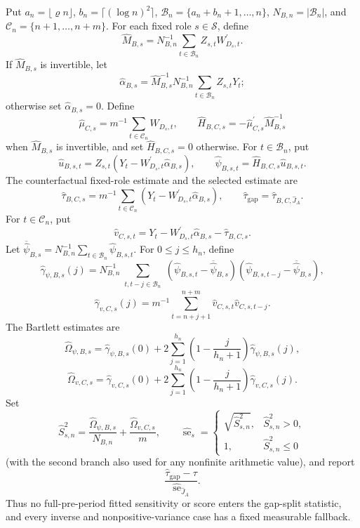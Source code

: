 Put \(a_n=\lfloor\varrho n\rfloor\), \(b_n=\lceil(\log n)^2\rceil\), \(\mathcal B_n=\{a_n+b_n+1,\ldots,n\}\), \(N_{B,n}=|\mathcal B_n|\), and \(\mathcal C_n=\{n+1,\ldots,n+m\}\).  For each fixed role \(s\in\mathcal S\), define
\[
 \widehat M_{B,s}=N_{B,n}^{-1}\sum_{t\in\mathcal B_n}Z_{s,t}W_{D_s,t}^{\prime}.
\]
If \(\widehat M_{B,s}\) is invertible, let
\[
 \widehat\alpha_{B,s}
 =\widehat M_{B,s}^{-1}N_{B,n}^{-1}
   \sum_{t\in\mathcal B_n}Z_{s,t}Y_t;
\]
otherwise set \(\widehat\alpha_{B,s}=0\).  Define
\[
 \widehat\mu_{C,s}=m^{-1}\sum_{t\in\mathcal C_n}W_{D_s,t},
 \qquad
 \widehat H_{B,C,s}=-\widehat\mu_{C,s}^{\prime}\widehat M_{B,s}^{-1}
\]
when \(\widehat M_{B,s}\) is invertible, and set \(\widehat H_{B,C,s}=0\) otherwise.  For \(t\in\mathcal B_n\), put
\[
 \widehat u_{B,s,t}=Z_{s,t}
  (Y_t-W_{D_s,t}^{\prime}\widehat\alpha_{B,s}),
 \qquad
 \widehat\psi_{B,s,t}=\widehat H_{B,C,s}\widehat u_{B,s,t}.
\]
The counterfactual fixed-role estimate and the selected estimate are
\[
 \widehat\tau_{B,C,s}=m^{-1}\sum_{t\in\mathcal C_n}
 (Y_t-W_{D_s,t}^{\prime}\widehat\alpha_{B,s}),
 \qquad
 \widehat\tau_{\mathrm{gap}}=\widehat\tau_{B,C,\widehat J_A}.
\]
For \(t\in\mathcal C_n\), put
\[
 \widehat v_{C,s,t}=Y_t-W_{D_s,t}^{\prime}\widehat\alpha_{B,s}
 -\widehat\tau_{B,C,s}.
\]
Let \(\overline{\widehat\psi}_{B,s}=N_{B,n}^{-1}\sum_{t\in\mathcal B_n}\widehat\psi_{B,s,t}\).  For \(0\leq j\leq h_n\), define
\[
 \widehat\gamma_{\psi,B,s}(j)=N_{B,n}^{-1}
 \sum_{\substack{t,t-j\in\mathcal B_n}}
 (\widehat\psi_{B,s,t}-\overline{\widehat\psi}_{B,s})
 (\widehat\psi_{B,s,t-j}-\overline{\widehat\psi}_{B,s}),
\]
\[
 \widehat\gamma_{v,C,s}(j)=m^{-1}
 \sum_{t=n+j+1}^{n+m}\widehat v_{C,s,t}\widehat v_{C,s,t-j}.
\]
The Bartlett estimates are
\[
 \widehat\Omega_{\psi,B,s}=\widehat\gamma_{\psi,B,s}(0)
 +2\sum_{j=1}^{h_n}\left(1-\frac{j}{h_n+1}\right)
 \widehat\gamma_{\psi,B,s}(j),
\]
\[
 \widehat\Omega_{v,C,s}=\widehat\gamma_{v,C,s}(0)
 +2\sum_{j=1}^{h_n}\left(1-\frac{j}{h_n+1}\right)
 \widehat\gamma_{v,C,s}(j).
\]
Set
\[
 \widehat S_{s,n}^2
 =\frac{\widehat\Omega_{\psi,B,s}}{N_{B,n}}
  +\frac{\widehat\Omega_{v,C,s}}m,
 \qquad
 \widehat{\operatorname{se}}_s=
 \begin{cases}
  \sqrt{\widehat S_{s,n}^2},&\widehat S_{s,n}^2>0,\\
  1,&\widehat S_{s,n}^2\leq0
 \end{cases}
\]
(with the second branch also used for any nonfinite arithmetic value), and report
\[
 \frac{\widehat\tau_{\mathrm{gap}}-\tau}
 {\widehat{\operatorname{se}}_{\widehat J_A}}.
\]
Thus no full-pre-period fitted sensitivity or score enters the gap-split statistic, and every inverse and nonpositive-variance case has a fixed measurable fallback.

